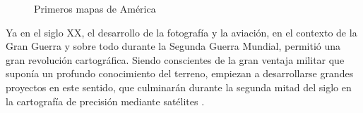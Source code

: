 \begin{figure}[h!btp]
	\begin{adjustbox}{minipage=\linewidth, fbox}
		\centering
		\hspace{10mm}
	\end{adjustbox}
	\caption{Primeros mapas de América}
	\label{fig:mapas-america}
\end{figure}

Ya en el siglo XX, el desarrollo de la fotografía y la aviación, en el contexto de la Gran Guerra y sobre todo durante la Segunda Guerra Mundial, permitió una gran revolución cartográfica. Siendo conscientes de la gran ventaja militar que suponía un profundo conocimiento del terreno, empiezan a desarrollarse grandes proyectos en este sentido, que culminarán durante la segunda mitad del siglo en la cartografía de precisión mediante satélites \cite{Lind06}.

